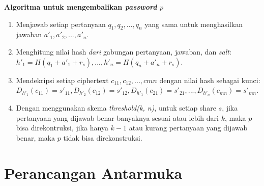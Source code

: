\begin{flushleft}
	\textbf{Algoritma untuk mengembalikan \textit{password} \begin{math}p\end{math}}
\end{flushleft}

\begin{enumerate}[label={(\arabic*)}]
	\item Menjawab setiap pertanyaan \begin{math}q_1, q_2, ..., q_n\end{math} yang sama untuk menghasilkan jawaban \begin{math}a'_1, a'_2, ..., a'_n\end{math}.
	\item Menghitung nilai hash \textit{dari} gabungan pertanyaan, jawaban, dan \textit{salt}: \begin{math}h'_1 = H(q_1+a'_1+r_s), ..., h'_n = H(q_n+a'_n+r_s)\end{math}.
	\item Mendekripsi setiap ciphertext \begin{math}c_{11}, c_{12}, ..., c{mn}\end{math} dengan nilai hash sebagai kunci: \begin{math}D_{h'_1}(c_{11}) = s'_{11}, D_{h'_2}(c_{12}) = s'_{12}, D_{h'_1}(c_{21}) = s'_{21}, ..., D_{h'_n}(c_{mn}) = s'_{mn}\end{math}.
	\item Dengan menggunakan skema \textit{threshold(k, n)}, untuk setiap share \begin{math}s\end{math}, jika pertanyaan yang dijawab benar banyaknya sesuai atau lebih dari \begin{math}k\end{math}, maka \begin{math}p\end{math} bisa direkontruksi, jika hanya \begin{math}k-1\end{math} atau kurang pertanyaan yang dijawab benar, maka \begin{math}p\end{math} tidak bisa direkonstruksi.
\end{enumerate}

\section{Perancangan Antarmuka}